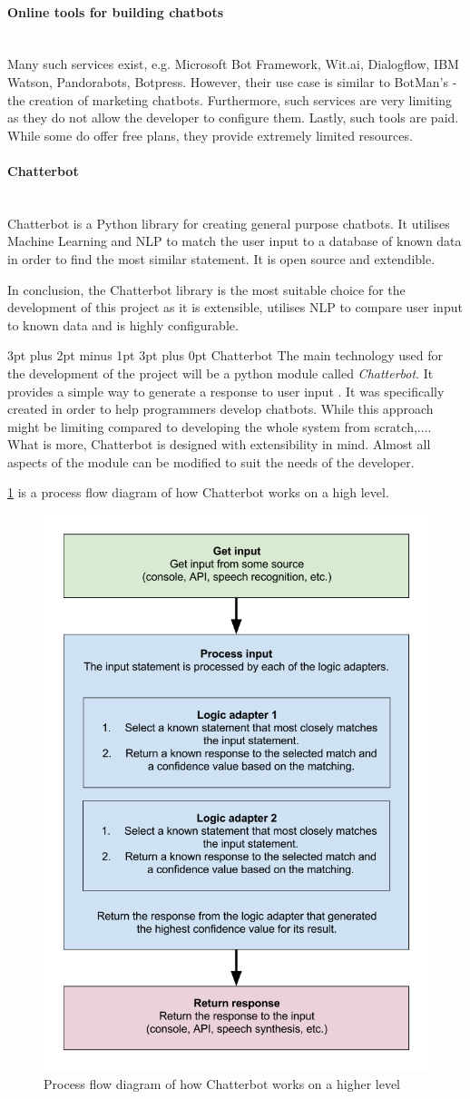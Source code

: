 \documentclass[12pt,a4paper]{article}
\makeatletter
\newcommand{\myparagraph}[1]{\paragraph{#1}\mbox{}\\}
\renewcommand\subsection{\@startsection {subsection}{1}{2mm} %
                                        {3pt plus 2pt minus 1pt} %
                                        {3pt plus 0pt} %
                                        {\normalfont\bfseries}}
\newcommand{\captionstyle}[1] {
    \small{#1}
}
\makeatother
\begin{document}
\myparagraph{Online tools for building chatbots}
Many such services exist, e.g. Microsoft Bot Framework, Wit.ai, Dialogflow, IBM Watson, Pandorabots, Botpress. However, their use case is similar to BotMan's - the creation of marketing chatbots. Furthermore, such services are very limiting as they do not allow the developer to configure them. Lastly, such tools are paid. While some do offer free plans, they provide extremely limited resources.

\myparagraph{Chatterbot}
Chatterbot is a Python library for creating general purpose chatbots. It utilises Machine Learning and NLP to match the user input to a database of known data in order to find the most similar statement. It is open source and extendible. 

In conclusion, the Chatterbot library is the most suitable choice for the development of this project as it is extensible, utilises NLP to compare user input to known data and is highly configurable.

\subsection{Chatterbot}
The main technology used for the development of the project will be a python module called \textit{Chatterbot}. It provides a simple way to generate a response to user input \cite{Chatterbot:online}. It was specifically created in order to help programmers develop chatbots. While this approach might be limiting compared to developing the whole system from scratch,.... What is more, Chatterbot is designed with extensibility in mind. Almost all aspects of the module can be modified to suit the needs of the developer.

\cref{fig:chatterbot-process-flow} is a process flow diagram of how Chatterbot works on a high level.

\begin{figure}[!htb]%
    \centering
    \includegraphics[width=0.6\columnwidth]{chatterbot-process-flow}%
    \caption{\captionstyle{Process flow diagram of how Chatterbot works on a higher level \cite{Chatterbot:online}}}%
    \label{fig:chatterbot-process-flow}%
\end{figure}
\end{document}
